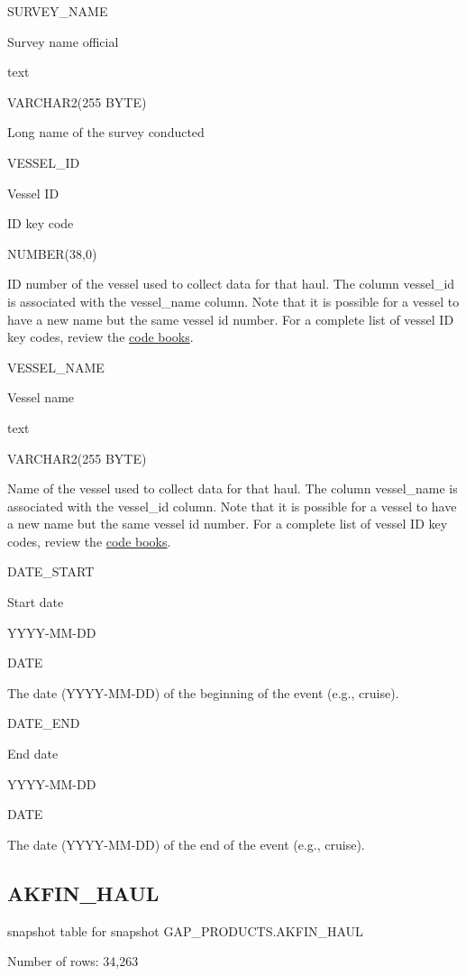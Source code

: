 \documentclass[
  letterpaper,
  oneside,
  open=any]{scrbook}
\begin{document}
SURVEY\_NAME

Survey name official

text

VARCHAR2(255 BYTE)

Long name of the survey conducted

VESSEL\_ID

Vessel ID

ID key code

NUMBER(38,0)

ID number of the vessel used to collect data for that haul. The column
vessel\_id is associated with the vessel\_name column. Note that it is
possible for a vessel to have a new name but the same vessel id number.
For a complete list of vessel ID key codes, review the
\href{https://www.fisheries.noaa.gov/resource/document/groundfish-survey-species-code-manual-and-data-codes-manual}{code
books}.

VESSEL\_NAME

Vessel name

text

VARCHAR2(255 BYTE)

Name of the vessel used to collect data for that haul. The column
vessel\_name is associated with the vessel\_id column. Note that it is
possible for a vessel to have a new name but the same vessel id number.
For a complete list of vessel ID key codes, review the
\href{https://www.fisheries.noaa.gov/resource/document/groundfish-survey-species-code-manual-and-data-codes-manual}{code
books}.

DATE\_START

Start date

YYYY-MM-DD

DATE

The date (YYYY-MM-DD) of the beginning of the event (e.g., cruise).

DATE\_END

End date

YYYY-MM-DD

DATE

The date (YYYY-MM-DD) of the end of the event (e.g., cruise).

\subsection{AKFIN\_HAUL}\label{akfin_haul}

snapshot table for snapshot GAP\_PRODUCTS.AKFIN\_HAUL

Number of rows: 34,263
\end{document}
